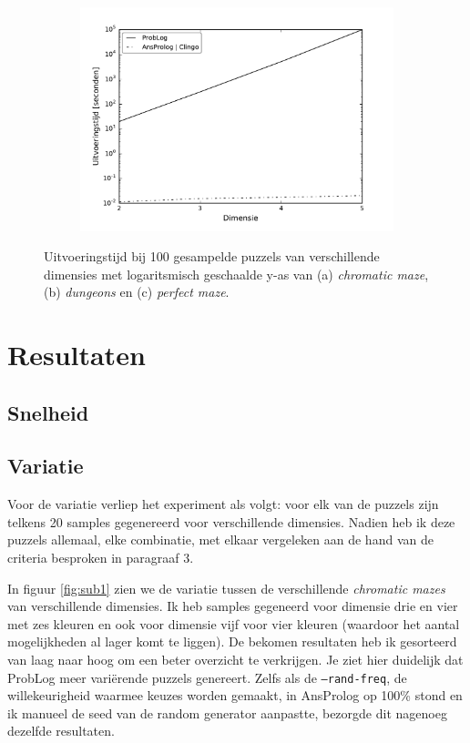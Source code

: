 \documentclass{article}
\begin{document}
\begin{figure}[t]
\begin{subfigure}{.33\textwidth}
  \includegraphics[width=\linewidth]{Grafieken/Tijd/pm_100_log.pdf}
  \caption{}
  \label{fig:sub3}
\end{subfigure}
\caption{Uitvoeringstijd bij 100 gesampelde puzzels van verschillende dimensies met logaritsmisch geschaalde y-as van (a) \textit{chromatic maze}, (b) \textit{dungeons} en (c) \textit{perfect maze}.}
\label{fig:test}
\end{figure}	
	
\section{Resultaten}

	\subsection{Snelheid}
	
	\subsection{Variatie}
	Voor de variatie verliep het experiment als volgt: voor elk van de puzzels zijn telkens 20 samples gegenereerd voor verschillende dimensies. Nadien heb ik deze puzzels allemaal, elke combinatie, met elkaar vergeleken aan de hand van de criteria besproken in paragraaf 3.
	
	In figuur \ref{fig:sub1} zien we de variatie tussen de verschillende \textit{chromatic mazes} van verschillende dimensies. Ik heb samples gegeneerd voor dimensie drie en vier met zes kleuren en ook voor dimensie vijf voor vier kleuren (waardoor het aantal mogelijkheden al lager komt te liggen). De bekomen resultaten heb ik gesorteerd van laag naar hoog om een beter overzicht te verkrijgen. Je ziet hier duidelijk dat ProbLog meer vari\"erende puzzels genereert. Zelfs als de \texttt{--rand-freq}, de willekeurigheid waarmee keuzes worden gemaakt, in AnsProlog op 100\% stond en ik manueel de seed van de random generator aanpastte, bezorgde dit nagenoeg dezelfde resultaten.	
	
\end{document}
